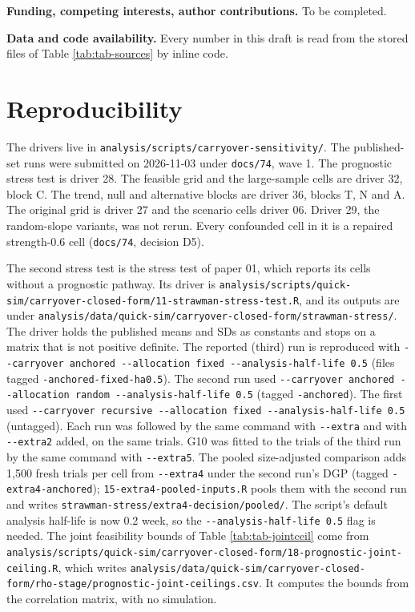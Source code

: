 \documentclass[
  11pt,
]{article}
\begin{document}
\textbf{Funding, competing interests, author contributions.} To be
completed.

\textbf{Data and code availability.} Every number in this draft is read
from the stored files of Table \ref{tab:tab-sources} by inline code.

\section{Reproducibility}\label{sec-repro}

The drivers live in \texttt{analysis/scripts/carryover-sensitivity/}. The
published-set runs were submitted on 2026-11-03 under \texttt{docs/74},
wave 1. The prognostic stress test is driver 28. The feasible grid and
the large-sample cells are driver 32, block C. The trend, null and
alternative blocks are driver 36, blocks T, N and A. The original
grid is driver 27 and the scenario cells driver 06. Driver 29, the
random-slope variants, was not rerun. Every confounded cell in it is
a repaired strength-0.6 cell (\texttt{docs/74}, decision D5).

The second stress test is the stress test of paper 01, which reports
its cells without a prognostic pathway. Its driver is
\texttt{analysis/scripts/quick-sim/carryover-closed-form/11-strawman-stress-test.R},
and its outputs are under
\texttt{analysis/data/quick-sim/carryover-closed-form/strawman-stress/}. The
driver holds the published means and SDs as constants and stops on a
matrix that is not positive definite. The reported (third) run is
reproduced with \texttt{-\/-carryover\ anchored\ -\/-allocation\ fixed\ -\/-analysis-half-life\ 0.5} (files tagged \texttt{-anchored-fixed-ha0.5}). The
second run used \texttt{-\/-carryover\ anchored\ -\/-allocation\ random\ -\/-analysis-half-life\ 0.5} (tagged \texttt{-anchored}). The first used
\texttt{-\/-carryover\ recursive\ -\/-allocation\ fixed\ -\/-analysis-half-life\ 0.5}
(untagged). Each run was followed by the same command with \texttt{-\/-extra}
and with \texttt{-\/-extra2} added, on the same trials. G10 was fitted to the
trials of the third run by the same command with \texttt{-\/-extra5}. The
pooled size-adjusted comparison adds 1,500 fresh trials per cell from
\texttt{-\/-extra4} under the second run's DGP (tagged \texttt{-extra4-anchored});
\texttt{15-extra4-pooled-inputs.R} pools them with the second run and writes
\texttt{strawman-stress/extra4-decision/pooled/}. The script's default
analysis half-life is now 0.2 week, so the \texttt{-\/-analysis-half-life\ 0.5} flag is needed. The joint
feasibility bounds of Table \ref{tab:tab-jointceil} come from
\texttt{analysis/scripts/quick-sim/carryover-closed-form/18-prognostic-joint-ceiling.R},
which writes
\texttt{analysis/data/quick-sim/carryover-closed-form/rho-stage/prognostic-joint-ceilings.csv}.
It computes the bounds from the correlation matrix, with no
simulation.
\end{document}
